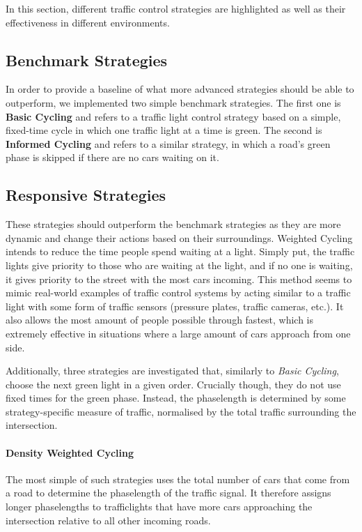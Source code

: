 \documentclass[10pt]{article}
\begin{document}
\label{sec:strategies}
In this section, different traffic control strategies are highlighted as well as their effectiveness in different environments.

\subsection{Benchmark Strategies} 
In order to provide a baseline of what more advanced strategies should be able to outperform, we implemented two simple benchmark strategies. The first one is \textbf{Basic Cycling} and refers to a traffic light control strategy based on a simple, fixed-time cycle in which one traffic light at a time is green. The second is \textbf{Informed Cycling} and refers to a similar strategy, in which a road's green phase is skipped if there are no cars waiting on it.

\subsection{Responsive Strategies}
These strategies should outperform the benchmark strategies as they are more dynamic and change their actions based on their surroundings. Weighted Cycling intends to reduce the time people spend waiting at a light. Simply put, the traffic lights give priority to those who are waiting at the light, and if no one is waiting, it gives priority to the street with the most cars incoming. This method seems to mimic real-world examples of traffic control systems by acting similar to a traffic light with some form of traffic sensors (pressure plates, traffic cameras, etc.). It also allows the most amount of people possible through fastest, which is extremely effective in situations where a large amount of cars approach from one side. 

Additionally, three strategies are investigated that, similarly to \textit{Basic Cycling}, choose the next green light in a given order. Crucially though, they do not use fixed times for the green phase. Instead, the phaselength is determined by some strategy-specific measure of traffic, normalised by the total traffic surrounding the intersection.

\paragraph{Density Weighted Cycling} The most simple of such strategies uses the total number of cars that come from a road to determine the phaselength of the traffic signal. It therefore assigns longer phaselengths to trafficlights that have more cars approaching the intersection relative to all other incoming roads.
\end{document}
